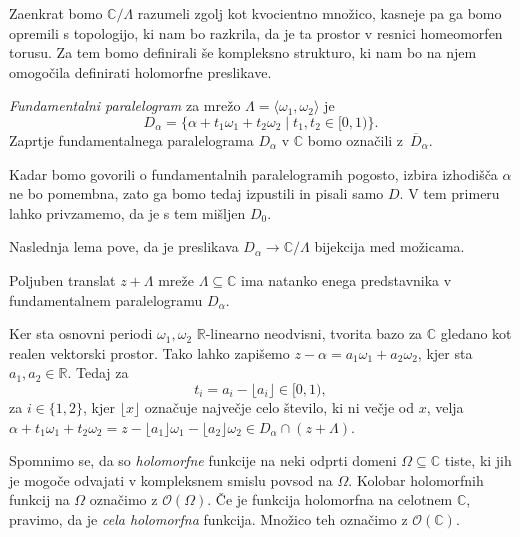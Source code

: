 \documentclass[mat1]{fmfdelo}
\numberwithin{equation}{section}
\newcommand{\R}{\mathbb R}
\newcommand{\C}{\mathbb C}
\newcommand{\om}{\omega}
\newcommand{\hol}[1]{\mathcal{O}(#1)}
\newcommand{\olsi}[1]{\,\overline{\!{#1}}} %
\theoremstyle{definition}
\begin{document}
Zaenkrat bomo $\C/\Lambda$ razumeli zgolj kot kvocientno množico, kasneje pa ga bomo opremili s topologijo, ki nam bo razkrila, da je ta prostor v resnici homeomorfen torusu. Za tem bomo definirali še kompleksno strukturo, ki nam bo na njem omogočila definirati holomorfne preslikave.


\begin{definicija}
    \emph{Fundamentalni paralelogram} za mrežo $\Lambda = \langle \om_1, \om_2 \rangle$ je
    \[
        D_{\alpha} = \{\alpha + t_1 \om_1 + t_2 \om_2 \mid t_1, t_2 \in [0,1)\}.
    \]
    Zaprtje fundamentalnega paralelograma $D_\alpha$ v $\C$ bomo označili z $\olsi{D}_\alpha$. 
\end{definicija}

\begin{opomba}
    Kadar bomo govorili o fundamentalnih paralelogramih pogosto, izbira izhodišča $\alpha$ ne bo pomembna, zato ga bomo tedaj izpustili in pisali samo $D$. V tem primeru lahko privzamemo, da je s tem mišljen $D_0$. 
\end{opomba}

Naslednja lema pove, da je preslikava $D_\alpha \to \C/\Lambda$ bijekcija med možicama. 

\begin{lema}
    \label{enolicni predstavnik}
    Poljuben translat $z + \Lambda$ mreže $\Lambda \subseteq \C$ ima natanko enega predstavnika v fundamentalnem paralelogramu $D_\alpha$. 
\end{lema}

\begin{dokaz}
    Ker sta osnovni periodi $\omega_1, \omega_2$ $\R$-linearno neodvisni, tvorita bazo za $\C$ gledano kot realen vektorski prostor. Tako lahko zapišemo $z - \alpha = a_1 \om_1 + a_2 \om_2$, kjer sta $a_1, a_2 \in \R$. Tedaj za 
    \[
        t_i = a_i - \lfloor a_i \rfloor \in [0,1),
    \] 
    za $i \in \{1,2\}$, kjer $\lfloor x \rfloor$ označuje največje celo število, ki ni večje od $x$, velja $\alpha + t_1\om_1 + t_2 \om_2 = z - \lfloor a_1 \rfloor \om_1 - \lfloor a_2 \rfloor \om_2 \in D_\alpha \cap (z + \Lambda)$.
\end{dokaz}

Spomnimo se, da so \emph{holomorfne} funkcije na neki odprti domeni $\Omega \subseteq \C$ tiste, ki jih je mogoče odvajati v kompleksnem smislu povsod na $\Omega$. Kolobar holomorfnih funkcij na $\Omega$ označimo z $\hol{\Omega}$. Če je funkcija holomorfna na celotnem $\C$, pravimo, da je \emph{cela holomorfna} funkcija. Množico teh označimo z $\hol{\C}$.
\end{document}
